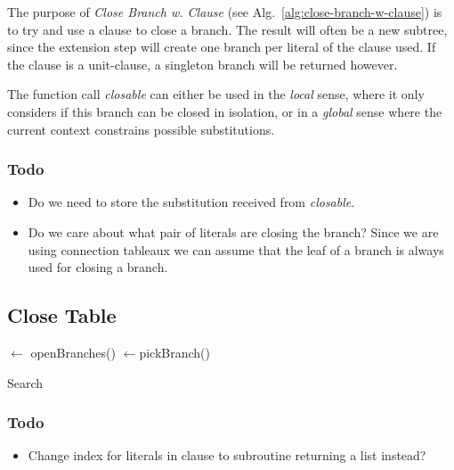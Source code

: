 \documentclass{article}
\begin{document}
The purpose of \emph{Close Branch w. Clause} (see
Alg.~\ref{alg:close-branch-w-clause}) is to try and use a clause to
close a branch. The result will often be a new subtree, since the
extension step will create one branch per literal of the clause
used. If the clause is a unit-clause, a singleton branch will be
returned however.

The function call \emph{closable} can either be used in the
\emph{local} sense, where it only considers if this branch can be
closed in isolation, or in a \emph{global} sense where the current
context constrains possible substitutions.

\subsubsection{Todo}
\begin{itemize}
\item Do we need to store the substitution received from \emph{closable}.
\item Do we care about what pair of literals are closing the branch?
  Since we are using connection tableaux we can assume that the leaf
  of a branch is always used for closing a branch.
\end{itemize}


\subsection{Close Table}

\begin{algorithm}[H]

  \SetAlgoLined
  \openbranches$\leftarrow$ openBranches(\tbl)\;
  \branch$\leftarrow$pickBranch(\tbl)\;
  \Return \none
 \caption{Search}
\end{algorithm}

\subsubsection{Todo}
\begin{itemize}
  \item Change index for literals in clause to subroutine returning a list instead?
\end{itemize}
\end{document}
